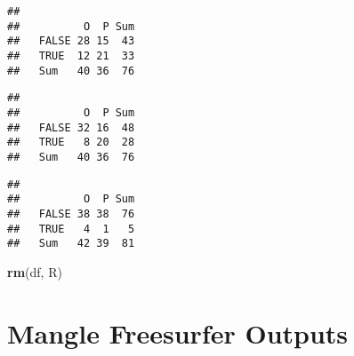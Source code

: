 \documentclass[]{article}
\newenvironment{Shaded}{\begin{snugshade}}{\end{snugshade}}
\newcommand{\KeywordTok}[1]{\textcolor[rgb]{0.13,0.29,0.53}{\textbf{#1}}}
\newcommand{\StringTok}[1]{\textcolor[rgb]{0.31,0.60,0.02}{#1}}
\newcommand{\CommentTok}[1]{\textcolor[rgb]{0.56,0.35,0.01}{\textit{#1}}}
\newcommand{\OperatorTok}[1]{\textcolor[rgb]{0.81,0.36,0.00}{\textbf{#1}}}
\newcommand{\NormalTok}[1]{#1}
\theoremstyle{definition}
\theoremstyle{definition}
\theoremstyle{definition}
\theoremstyle{remark}
\begin{document}
\begin{verbatim}
##        
##          O  P Sum
##   FALSE 28 15  43
##   TRUE  12 21  33
##   Sum   40 36  76
\end{verbatim}

\begin{Shaded}
\end{Shaded}

\begin{verbatim}
##        
##          O  P Sum
##   FALSE 32 16  48
##   TRUE   8 20  28
##   Sum   40 36  76
\end{verbatim}

\begin{Shaded}
\end{Shaded}

\begin{verbatim}
##        
##          O  P Sum
##   FALSE 38 38  76
##   TRUE   4  1   5
##   Sum   42 39  81
\end{verbatim}

\begin{Shaded}
\begin{Highlighting}[]
\KeywordTok{rm}\NormalTok{(df, R)}
\end{Highlighting}
\end{Shaded}

\section{Mangle Freesurfer Outputs}\label{mangle-freesurfer-outputs}
\end{document}
